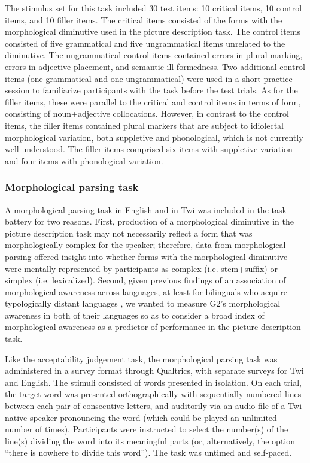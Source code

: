 \documentclass[output=paper,colorlinks,citecolor=brown]{langscibook}
\begin{document}
The stimulus set for this task included 30 test items: 10 critical items, 10 control items, and 10 filler items. The critical items consisted of the forms with the morphological diminutive used in the picture description task. The control items consisted of five grammatical and five ungrammatical items unrelated to the diminutive. The ungrammatical control items contained errors in plural marking, errors in adjective placement, and semantic ill-formedness. Two additional control items (one grammatical and one ungrammatical) were used in a short practice session to familiarize participants with the task before the test trials. As for the filler items, these were parallel to the critical and control items in terms of form, consisting of noun+adjective collocations. However, in contrast to the control items, the filler items contained plural markers that are subject to idiolectal morphological variation, both suppletive and phonological, which is not currently well understood. The filler items comprised six items with suppletive variation and four items with phonological variation.

\subsubsection{Morphological parsing task}
\label{MPTSec}

A morphological parsing task in English and in Twi was included in the task battery for two reasons. First, production of a morphological diminutive in the picture description task may not necessarily reflect a form that was morphologically complex for the speaker; therefore, data from morphological parsing offered insight into whether forms with the morphological diminutive were mentally represented by participants as complex (i.e. stem+suffix) or simplex (i.e. lexicalized). Second, given previous findings of an association of morphological awareness across languages, at least for bilinguals who acquire typologically distant languages \citep{HayashiMurphy2013}, we wanted to measure G2's morphological awareness in both of their languages so as to consider a broad index of morphological awareness as a predictor of performance in the picture description task.

Like the acceptability judgement task, the morphological parsing task was administered in a survey format through Qualtrics, with separate surveys for Twi and English. The stimuli consisted of words presented in isolation. On each trial, the target word was presented orthographically with sequentially numbered lines between each pair of consecutive letters, and auditorily via an audio file of a Twi native speaker pronouncing the word (which could be played an unlimited number of times). Participants were instructed to select the number(s) of the line(s) dividing the word into its meaningful parts (or, alternatively, the option “there is nowhere to divide this word”). The task was untimed and self-paced.
\end{document}
